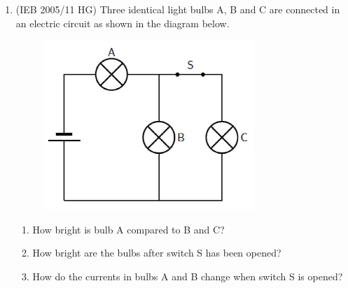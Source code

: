 \begin{enumerate}[noitemsep, label=\textbf{\arabic*}. ]
\begin{enumerate}[noitemsep, label=\textbf{\alph*}. ]
\end{enumerate}
                  \label{m38776*uid100}\item (IEB 2005/11 HG) Three identical light bulbs A, B and C are connected in an electric circuit as shown in the diagram below.
    \setcounter{subfigure}{0}
	\begin{figure}[H] %
    \begin{center}
    \label{m38776*id68542!!!underscore!!!media}\label{m38776*id68542!!!underscore!!!printimage}\includegraphics[width=300px]{col11305.imgs/m38776_PG10C9_037.png} %
      \vspace{2pt}
    \vspace{.1in}
    \end{center}
 \end{figure}       \label{m38776*id68549}\begin{enumerate}[noitemsep, label=\textbf{\alph*}. ] 
            \label{m38776*uid101}\item How bright is bulb A compared to B and C?
\label{m38776*uid102}\item How bright are the bulbs after switch S has been opened?
\label{m38776*uid103}\item How do the currents in bulbs A and B change when switch S is opened?
          \begin{table}[H]
        \begin{center}
      \label{m38776*id68590}
    \noindent
      \tablelasttail{}
      \begin{xtabular}[t]{|l|l|l|}\hline

\end{xtabular}
\end{center}
\end{table}
\end{enumerate}
\end{enumerate}
